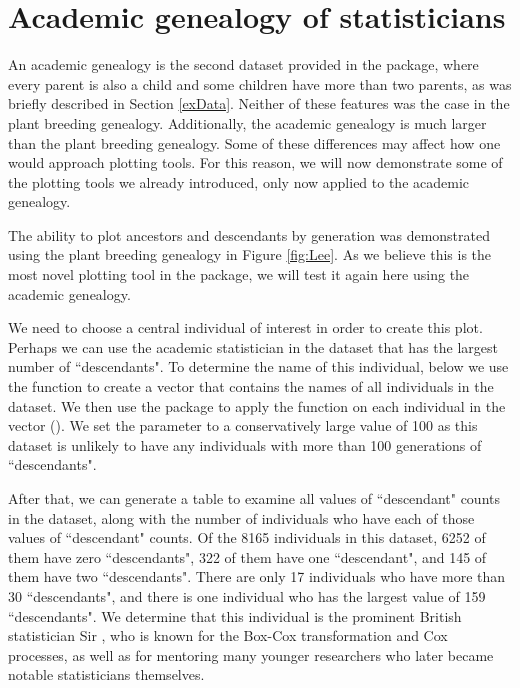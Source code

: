 \documentclass[article,shortnames]{jss}
\begin{document}
\section{Academic genealogy of statisticians}

An academic genealogy is the second dataset provided in the package, where every parent is also a child and some children have more than two parents, as was briefly described in Section \ref{exData}. Neither of these features was the case in the plant breeding genealogy. Additionally, the academic genealogy is much larger than the plant breeding genealogy. Some of these differences may affect how one would approach  plotting tools. For this reason, we will now demonstrate some of the  plotting tools we already introduced, only now applied to the academic genealogy. 

The ability to plot ancestors and descendants by generation was demonstrated using the plant breeding genealogy in Figure \ref{fig:Lee}. As we believe this is the most novel plotting tool in the  package, we will test it again here using the academic genealogy.

We need to choose a central individual of interest in order to create this plot. Perhaps we can use the academic statistician in the dataset that has the largest number of ``descendants". To determine the name of this individual, below we use the  function  to create a vector  that contains the names of all individuals in the dataset. We then use the  package to apply the  function  on each individual in the  vector (\citealt{dplyr}). We set the parameter  to a conservatively large value of 100 as this dataset is unlikely to have any individuals with more than 100 generations of ``descendants".

After that, we can generate a table to examine all values of ``descendant" counts in the dataset, along with the number of individuals who have each of those values of ``descendant" counts. Of the 8165 individuals in this dataset, 6252 of them have zero ``descendants", 322 of them have one ``descendant", and 145 of them have two ``descendants". There are only 17 individuals who have more than 30 ``descendants", and there is one individual who has the largest value of 159 ``descendants". We determine that this individual is the prominent British statistician Sir , who is known for the Box-Cox transformation and Cox processes, as well as for mentoring many younger researchers who later became notable statisticians themselves.
\end{document}
